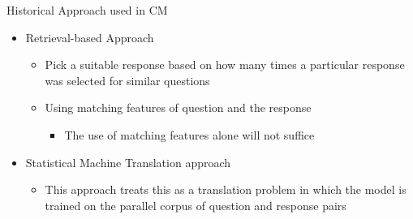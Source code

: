 \begin{frame}{Historical Approach used in CM}
	\begin{itemize}
		\item Retrieval-based Approach
		\begin{itemize}
			\item Pick a suitable response based on how many times a particular response was selected for similar questions
			\item Using matching features of question and the response
			\begin{itemize}
				\item The use of matching features alone will not suffice
			\end{itemize}
		\end{itemize}
		\item Statistical Machine Translation approach
		\begin{itemize}
			\item This approach treats this as a translation problem in which the model is trained on the parallel corpus of question and response pairs
		\end{itemize}

	\end{itemize}

\end{frame}
